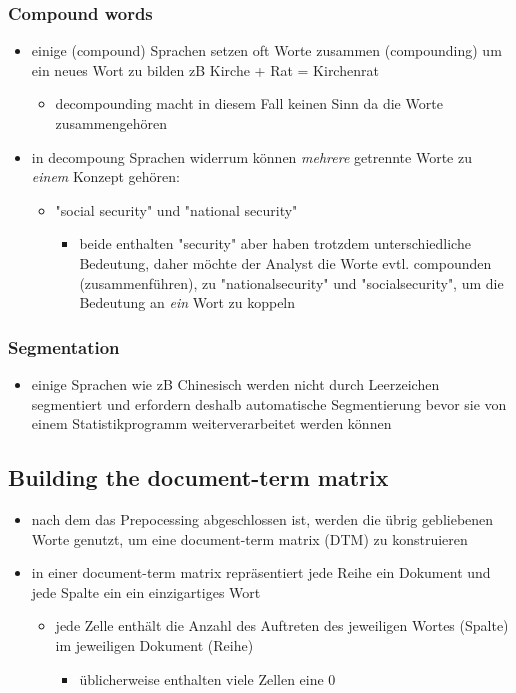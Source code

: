 \documentclass[11pt]{article}
\begin{document}
\subsubsection{Compound words}
\label{sec:org30751ed}
\begin{itemize}
\item einige (compound) Sprachen setzen oft Worte zusammen (compounding) um ein neues Wort zu bilden zB Kirche + Rat = Kirchenrat
\begin{itemize}
\item decompounding macht in diesem Fall keinen Sinn da die Worte zusammengehören
\end{itemize}
\item in decompoung Sprachen widerrum können \emph{mehrere} getrennte Worte zu \emph{einem} Konzept gehören:
\begin{itemize}
\item "social security" und "national security"
\begin{itemize}
\item beide enthalten "security" aber haben trotzdem unterschiedliche Bedeutung, daher möchte der Analyst die Worte evtl. compounden (zusammenführen), zu "nationalsecurity" und "socialsecurity", um die Bedeutung an \emph{ein} Wort zu koppeln
\end{itemize}
\end{itemize}
\end{itemize}

\subsubsection{Segmentation}
\label{sec:org331c971}
\begin{itemize}
\item einige Sprachen wie zB Chinesisch werden nicht durch Leerzeichen segmentiert und erfordern deshalb automatische Segmentierung bevor sie von einem Statistikprogramm weiterverarbeitet werden können
\end{itemize}

\subsection{Building the document-term matrix}
\label{sec:orgecdf53c}
\begin{itemize}
\item nach dem das Prepocessing abgeschlossen ist, werden die übrig gebliebenen Worte genutzt, um eine document-term matrix (DTM) zu konstruieren
\item in einer document-term matrix repräsentiert jede Reihe ein Dokument und jede Spalte ein ein einzigartiges Wort
\begin{itemize}
\item jede Zelle enthält die Anzahl des Auftreten des jeweiligen Wortes (Spalte) im jeweiligen Dokument (Reihe)
\begin{itemize}
\item üblicherweise enthalten viele Zellen eine 0
\end{itemize}
\end{itemize}
\end{itemize}
\end{document}
